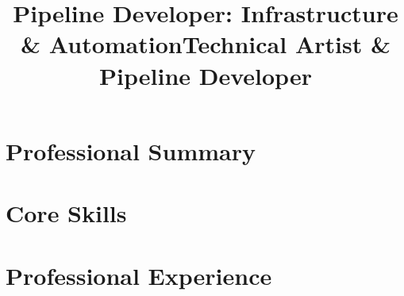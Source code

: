 \documentclass[10pt,a4paper,sans]{moderncv}
\title{\ApplyTitle}
\title{Pipeline Developer: Infrastructure \& Automation}
\title{Technical Artist \& Pipeline Developer}
\newif\ifIT
\newif\ifTechArt
\newcommand{\ApplyExtraSkills}{}  %
\begin{document}
\makecvtitle

\section{Professional Summary}
\ifIT
	\cvitem{}{Pipeline and infrastructure developer for an architectural visualization studio: Python automation, render-farm deployment, and Windows administration. Focused on unattended automation: silent software deployment, scheduled tasks, and git-based release workflows. Background in technical art; shipped SMITE 2 at Hi-Rez Studios.}
\fi
\ifTechArt
	\cvitem{}{Technical artist and pipeline developer. Shipped \textbf{SMITE 2} at Hi-Rez Studios: character rigging plus the Python/MaxScript tooling behind the asset pipeline. Now building production infrastructure for an \mbox{architectural} visualization studio: PyQt desktop tooling, render-farm automation, cross-DCC workflows. Also teach 3D rigging at the Cleveland Institute of Art, which keeps the tools grounded in how artists actually work.}
\fi

\section{Core Skills}
\ifIT
	\cvitem{Infrastructure}{Windows \& Linux administration; Microsoft 365 \& Azure; user/device management; remote access}
	\cvitem{Automation}{Python, Bash, PowerShell; silent software deployment; scheduled-task orchestration; batch processing}
	\cvitem{Render Farm}{Deployment and submission automation for 3ds Max render farms}
	\cvitem{Tools}{\ApplyExtraSkills Git, GitHub Actions, Perforce, Jira, Confluence, PyQt, pytest, PyInstaller}
\fi

\ifTechArt
	\cvitem{Programming}{Python (Maya API, PyMEL, PyQt/PySide, pymxs, pytest), MaxScript, MEL, \ApplyExtraSkills Bash, Git, Perforce}
	\cvitem{DCC/Engines}{3ds Max, Maya, Unreal Engine 5, Unity, Substance Painter}
	\cvitem{Focus}{Character rigging, pipeline development, asset and scene optimization, render-farm automation}
\fi

\section{Professional Experience}
\end{document}
